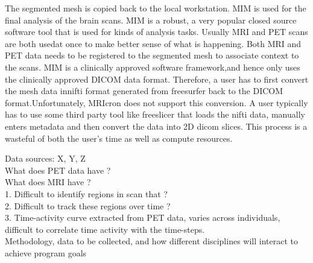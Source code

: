 \documentclass[11pt]{article}
\begin{document}
The segmented mesh is copied back to the local workstation. MIM is used for the final analysis of the brain scans. MIM is a robust, a very popular closed source software tool that is used for kinds of analysis tasks. Usually MRI and PET scans are both usedat once to make better sense of what is happening. Both MRI and PET data needs to be registered to the segmented mesh to associate context to the scans. MIM is a clinically approved software framework,and hence only uses the clinically approved DICOM data format. Therefore, a user has to first convert the mesh data innifti format generated from freesurfer back to the DICOM format.Unfortunately, MRIcron does not support this conversion. A user typically has to use some third party tool like freeslicer that loads the nifti data, manually enters metadata and then convert the data into 2D dicom slices. This process is a wasteful of both the user's time as well as compute resources.






Data sources: X, Y, Z \\
What does PET data have ? \\
What does MRI have ? \\
1. Difficult to identify regions in scan that ? \\
2. Difficult to track these regions over time ? \\
3. Time-activity curve extracted from PET data, varies across individuals, difficult to correlate time activity with the time-steps. \\


Methodology, data to be collected, and how different disciplines will interact to achieve program goals

\end{document}
